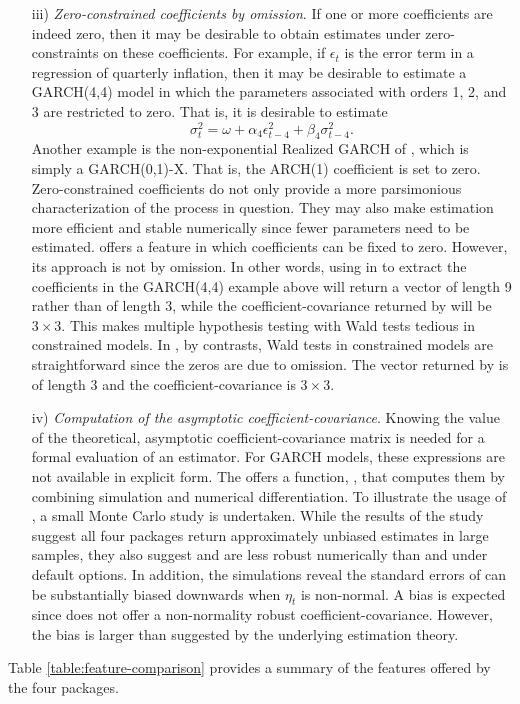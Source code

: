 \begin{itemize}
	\item[iii)] \textit{Zero-constrained coefficients by omission}. If one or more coefficients are indeed zero, then it may be desirable to obtain estimates under zero-constraints on these coefficients. For example, if $\epsilon_t$ is the error term in a regression of quarterly inflation, then it may be desirable to estimate a GARCH(4,4) model in which the parameters associated with orders 1, 2, and 3 are restricted to zero. That is, it is desirable to estimate \[ \sigma_t^2 = \omega + \alpha_4 \epsilon_{t-4}^2 + \beta_4\sigma_{t-4}^2. \] Another example is the non-exponential Realized GARCH of \citet{HansenHuangSchek2012}, which is simply a GARCH(0,1)-X. That is, the ARCH(1) coefficient is set to zero. Zero-constrained coefficients do not only provide a more parsimonious characterization of the process in question. They may also make estimation more efficient and stable numerically since fewer parameters need to be estimated.  offers a feature in which coefficients can be fixed to zero. However, its approach is not by omission. In other words, using  in  to extract the coefficients in the GARCH(4,4) example above will return a vector of length 9 rather than of length 3, while the coefficient-covariance returned by  will be $3 \times 3$. This makes multiple hypothesis testing with Wald tests tedious in constrained models. In , by contrasts, Wald tests in constrained models are straightforward since the zeros are due to omission. The vector returned by  is of length 3 and the coefficient-covariance is $3 \times 3$.
	
	\item[iv)] \textit{Computation of the asymptotic coefficient-covariance}. Knowing the value of the theoretical, asymptotic coefficient-covariance matrix is needed for a formal evaluation of an estimator. For GARCH models, these expressions are not available in explicit form. The  offers a function, , that computes them by combining simulation and numerical differentiation. To illustrate the usage of , a small Monte Carlo study is undertaken. While the results of the study suggest all four packages return approximately unbiased estimates in large samples, they also suggest  and  are less robust numerically than  and  under default options. In addition, the simulations reveal the standard errors of  can be substantially biased downwards when $\eta_t$ is non-normal. A bias is expected since  does not offer a non-normality robust coefficient-covariance. However, the bias is larger than suggested by the underlying estimation theory.
\end{itemize}
%
\noindent Table \ref{table:feature-comparison} provides a summary of the features offered by the four packages.

